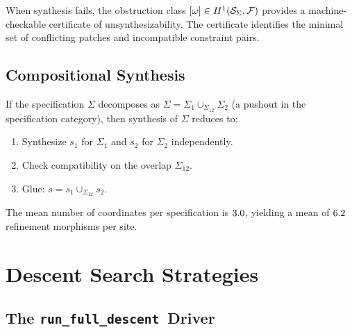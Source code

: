 \documentclass[11pt]{article}
\newcommand{\FragmentSpace}{\mathcal{F}}
\newcommand{\SpecSpace}{\mathcal{S}_\Sigma}
\newcommand{\RunDescent}{\texttt{run\_full\_descent}}
\begin{document}
\begin{corollary}\label{cor:obstruction}
When synthesis fails, the obstruction class
$[\omega] \in \Hcoh{1}(\SpecSpace, \FragmentSpace)$ provides a
machine-checkable certificate of unsynthesizability.  The certificate
identifies the minimal set of conflicting patches and incompatible
constraint pairs.
\end{corollary}

\subsection{Compositional Synthesis}

\begin{proposition}\label{prop:compositional}
If the specification $\Sigma$ decomposes as
$\Sigma = \Sigma_1 \cup_{\Sigma_{12}} \Sigma_2$ (a pushout in the
specification category), then synthesis of $\Sigma$ reduces to:
\begin{enumerate}[noitemsep]
  \item Synthesize $s_1$ for $\Sigma_1$ and $s_2$ for $\Sigma_2$
        independently.
  \item Check compatibility on the overlap $\Sigma_{12}$.
  \item Glue: $s = s_1 \cup_{\Sigma_{12}} s_2$.
\end{enumerate}
The mean number of coordinates per specification is
$3.0$, yielding a mean of $6.2$
refinement morphisms per site.
\end{proposition}

\section{Descent Search Strategies}\label{sec:descent-search}

\subsection{The \RunDescent\ Driver}
\end{document}
